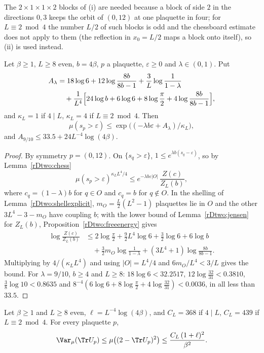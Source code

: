 The $2\times1\times1\times2$ blocks of (i) are needed because a block of
side $2$ in the directions $0,3$ keeps the orbit of $(0,12)$ at one
plaquette in four; for $L\equiv2\bmod4$ the number $L/2$ of such blocks is
odd and the chessboard estimate does not apply to them (the reflection in
$x_0=L/2$ maps a block onto itself), so (ii) is used instead.

\begin{theorem}\label{rDtwo:tail}
Let $\beta\ge1$, $L\ge8$ even, $b=4\beta$, $p$ a plaquette, $\varepsilon\ge
0$ and $\lambda\in(0,1)$. Put
\[
\begin{split}
A_\lambda&=18\log6+12\log\frac{8b}{8b-1}+\frac3L\log\frac1{1-\lambda}\\
&\quad+\frac1{L^4}\Bigl[24\log b+6\log6+8\log\frac\pi2+4\log\frac{8b}{8b-1}
\Bigr],
\end{split}
\]
and $\kappa_L=1$ if $4\mid L$, $\kappa_L=4$ if $L\equiv2\bmod4$. Then
\[
\mu(s_p>\varepsilon)\le\exp\bigl((-\lambda b\varepsilon+A_\lambda)/\kappa_L
\bigr),
\]
and $A_{9/10}\le33.5+24L^{-4}\log(4\beta)$.
\end{theorem}

\begin{proof}
By symmetry $p=(0,12)$. On $\{s_q>\varepsilon\}$, $1\le e^{\lambda b(s_q-
\varepsilon)}$, so by Lemma~\ref{rDtwo:chess}
\[
\mu(s_p>\varepsilon)^{\kappa_LL^4/4}\le e^{-\lambda b\varepsilon\lvert O\rvert}
\,\frac{Z(c)}{Z_L(b)},
\]
where $c_q=(1-\lambda)b$ for $q\in O$ and $c_q=b$ for $q\notin O$.
In the shelling of Lemma~\ref{rDtwo:shellexplicit}, $m_O=\frac L2(L^2-1)$
plaquettes lie in $O$ and the other $3L^4-3-m_O$ have coupling $b$; with the
lower bound of Lemma~\ref{rDtwo:jensen} for $Z_L(b)$,
Proposition~\ref{rDtwo:freeenergy} gives
\[
\begin{split}
\log\frac{Z(c)}{Z_L(b)}&\le2\log\tfrac\pi2+\tfrac92L^4\log6+\tfrac32\log6+6
\log b\\
&\quad+\tfrac32m_O\log\frac1{1-\lambda}+(3L^4+1)\log\frac{8b}{8b-1}.
\end{split}
\]
Multiplying by $4/(\kappa_LL^4)$ and using $\lvert O\rvert=L^4/4$ and
$6m_O/L^4<3/L$ gives the bound. For $\lambda=9/10$, $b\ge4$ and $L\ge8$:
$18\log6<32.2517$, $12\log\frac{32}{31}<0.3810$, $\frac38\log10<0.8635$ and
$8^{-4}(6\log6+8\log\frac\pi2+4\log\frac{32}{31})<0.0036$, in all less than
$33.5$.
\end{proof}

\begin{theorem}\label{rDtwo:secondmoment}
Let $\beta\ge1$ and $L\ge8$ even, $\ell=L^{-4}\log(4\beta)$, and $C_L=368$
if $4\mid L$, $C_L=439$ if $L\equiv2\bmod4$. For every plaquette $p$,
\[
\Var_\mu(\Tr U_p)\le\mu\bigl((2-\Tr U_p)^2\bigr)\le\frac{C_L\,(1+\ell)^2}
{\beta^2}.
\]
\end{theorem}

